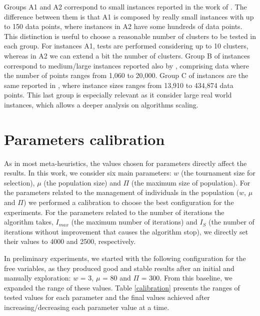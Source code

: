 Groups A1 and A2 correspond to small instances reported in the work of \cite{Ordin2014}. The difference between them is that A1 is composed by really small instances with up to 150 data points, where instances in A2 have some hundreds of data points. This distinction is useful to choose a reasonable number of clusters to be tested in each group. For instances A1, tests are performed considering up to 10 clusters, whereas in A2 we can extend a bit the number of clusters. Group B of instances correspond to medium/large instances reported also by \cite{Ordin2014}, comprising data where the number of points ranges from 1,060 to 20,000. Group C of instances are the same reported in \cite{Bagirov2016}, where instance sizes ranges from 13,910 to 434,874 data points. This last group is especially relevant as it consider large real world instances, which allows a deeper analysis on algorithms scaling.

\section{Parameters calibration}
\label{sec:calibration}
As in most meta-heuristics, the values chosen for parameters directly affect the results. In this work, we consider six main parameters: $w$ (the tournament size for selection), $\mu$ (the population size) and $\Pi$ (the maximum size of population). For the parameters related to the management of individuals in the population ($w$, $\mu$ and $\Pi$) we performed a calibration to choose the best configuration for the experiments. For the parameters related to the number of iterations the algorithm takes, $I_{max}$ (the maximum number of iterations) and $I_S$ (the number of iterations without improvement that causes the algorithm stop), we directly set their values to 4000 and 2500, respectively.

In preliminary experiments, we started with the following configuration for the free variables, as they produced good and stable results after an initial and manually exploration: $w$ = 3, $\mu$ = 80 and $\Pi$ = 300. From this baseline, we expanded the range of these values. Table \ref{calibration} presents the ranges of tested values for each parameter and the final values achieved after increasing/decreasing each parameter value at a time.



